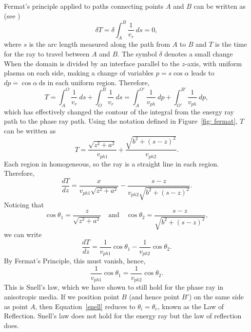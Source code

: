 \documentclass[12pt]{../style-files/ociamthesis}
\begin{document}
	Fermat's principle applied to paths connecting points $A$ and $B$ can be written as (see \citealp{bor_etal99})
	\begin{equation}
	\delta T = \delta \int_A^B \frac{1}{v_r} ~ds = 0,
	\end{equation}
	where $s$ is the arc length measured along the path from $A$ to $B$ and $T$ is the time for the ray to travel between $A$ and $B$. The symbol $\delta$ denotes a small change When the domain is divided by an interface parallel to the $z$-axis, with uniform plasma on each side, making a change of variables $p = s \cos{\alpha}$ leads to $dp = \cos{\alpha} ~\mathrm{ds}$ in each uniform region. Therefore, 
	\begin{equation}
	T = \int_A^O \frac{1}{v_r} ~ds + \int_O^B \frac{1}{v_r} ~ds = \int_A^{O'} \frac{1}{v_{ph}} ~dp + \int_{O'}^{B'} \frac{1}{v_{ph}} ~dp,
	\end{equation}
	which has effectively changed the contour of the integral from the energy ray path to the phase ray path. Using the notation defined in Figure~\ref{fig: fermat}, $T$ can be written as
	\begin{equation}
	T = \frac{\sqrt{z^2 + a^2}}{v_{ph1}} + \frac{\sqrt{b^2 + (s-z)^2}}{v_{ph2}}.
	\end{equation}
	Each region in homogeneous, so the ray is a straight line in each region. Therefore,
	\begin{equation}
	\frac{dT}{dz} = \frac{x}{v_{ph1}\sqrt{z^2 + a^2}} - \frac{s - z}{v_{ph2}\sqrt{b^2 + (s - z)^2}}.
	\end{equation}
	Noticing that
	\begin{equation}
	\cos{\theta_1} = \frac{z}{\sqrt{z^2 + a^2}} \quad \text{and} \quad \cos{\theta_2} = \frac{s - z}{\sqrt{b^2 + (s - z)^2}},
	\end{equation}
	we can write
	\begin{equation}
	\frac{dT}{dz} = \frac{1}{v_{ph1}}\cos{\theta_1} - \frac{1}{v_{ph2}}\cos{\theta_2}.
	\end{equation}
	By Fermat's Principle, this must vanish, hence,
	\begin{equation}
	\frac{1}{v_{ph1}}\cos{\theta_1} = \frac{1}{v_{ph2}}\cos{\theta_2}. \label{snell}
	\end{equation}
	This is Snell's law, which we have shown to still hold for the phase ray in anisotropic media. If we position point $B$ (and hence point $B'$) on the same side as point $A$, then Equation~\eqref{snell} reduces to $\theta_i = \theta_r$, known as the Law of Reflection. Snell's law does not hold for the energy ray but the law of reflection does.
	
\end{document}
